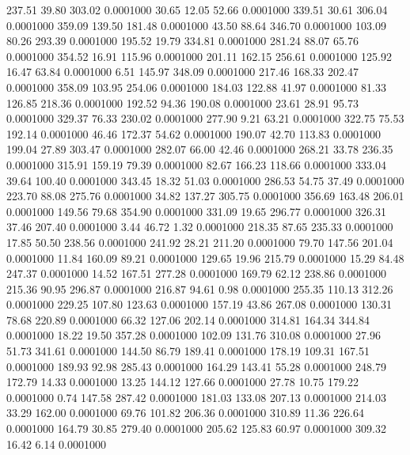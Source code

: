  237.51   39.80  303.02   0.0001000
  30.65   12.05   52.66   0.0001000
 339.51   30.61  306.04   0.0001000
 359.09  139.50  181.48   0.0001000
  43.50   88.64  346.70   0.0001000
 103.09   80.26  293.39   0.0001000
 195.52   19.79  334.81   0.0001000
 281.24   88.07   65.76   0.0001000
 354.52   16.91  115.96   0.0001000
 201.11  162.15  256.61   0.0001000
 125.92   16.47   63.84   0.0001000
   6.51  145.97  348.09   0.0001000
 217.46  168.33  202.47   0.0001000
 358.09  103.95  254.06   0.0001000
 184.03  122.88   41.97   0.0001000
  81.33  126.85  218.36   0.0001000
 192.52   94.36  190.08   0.0001000
  23.61   28.91   95.73   0.0001000
 329.37   76.33  230.02   0.0001000
 277.90    9.21   63.21   0.0001000
 322.75   75.53  192.14   0.0001000
  46.46  172.37   54.62   0.0001000
 190.07   42.70  113.83   0.0001000
 199.04   27.89  303.47   0.0001000
 282.07   66.00   42.46   0.0001000
 268.21   33.78  236.35   0.0001000
 315.91  159.19   79.39   0.0001000
  82.67  166.23  118.66   0.0001000
 333.04   39.64  100.40   0.0001000
 343.45   18.32   51.03   0.0001000
 286.53   54.75   37.49   0.0001000
 223.70   88.08  275.76   0.0001000
  34.82  137.27  305.75   0.0001000
 356.69  163.48  206.01   0.0001000
 149.56   79.68  354.90   0.0001000
 331.09   19.65  296.77   0.0001000
 326.31   37.46  207.40   0.0001000
   3.44   46.72    1.32   0.0001000
 218.35   87.65  235.33   0.0001000
  17.85   50.50  238.56   0.0001000
 241.92   28.21  211.20   0.0001000
  79.70  147.56  201.04   0.0001000
  11.84  160.09   89.21   0.0001000
 129.65   19.96  215.79   0.0001000
  15.29   84.48  247.37   0.0001000
  14.52  167.51  277.28   0.0001000
 169.79   62.12  238.86   0.0001000
 215.36   90.95  296.87   0.0001000
 216.87   94.61    0.98   0.0001000
 255.35  110.13  312.26   0.0001000
 229.25  107.80  123.63   0.0001000
 157.19   43.86  267.08   0.0001000
 130.31   78.68  220.89   0.0001000
  66.32  127.06  202.14   0.0001000
 314.81  164.34  344.84   0.0001000
  18.22   19.50  357.28   0.0001000
 102.09  131.76  310.08   0.0001000
  27.96   51.73  341.61   0.0001000
 144.50   86.79  189.41   0.0001000
 178.19  109.31  167.51   0.0001000
 189.93   92.98  285.43   0.0001000
 164.29  143.41   55.28   0.0001000
 248.79  172.79   14.33   0.0001000
  13.25  144.12  127.66   0.0001000
  27.78   10.75  179.22   0.0001000
   0.74  147.58  287.42   0.0001000
 181.03  133.08  207.13   0.0001000
 214.03   33.29  162.00   0.0001000
  69.76  101.82  206.36   0.0001000
 310.89   11.36  226.64   0.0001000
 164.79   30.85  279.40   0.0001000
 205.62  125.83   60.97   0.0001000
 309.32   16.42    6.14   0.0001000
